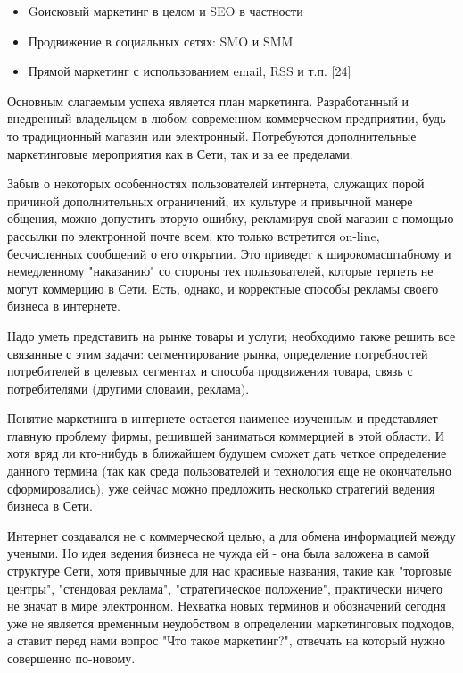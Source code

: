 \documentclass[a4paper,english,russian]{G2-105}
\begin{document}
\begin{itemize}
\item Gоисковый маркетинг в целом и SEO в частности
\item Продвижение в социальных сетях: SMO и SMM
\item Прямой маркетинг с использованием email, RSS и т.п. [24]
\end{itemize}
\par Основным слагаемым успеха является план маркетинга. Разработанный и внедренный владельцем в любом современном коммерческом предприятии, будь то традиционный магазин или электронный. Потребуются дополнительные маркетинговые мероприятия как в Сети, так и за ее пределами.
\par Забыв о некоторых особенностях пользователей интернета, служащих порой причиной дополнительных ограничений, их культуре и привычной манере общения, можно допустить вторую ошибку, рекламируя свой магазин с помощью рассылки по электронной почте всем, кто только встретится on-line, бесчисленных сообщений о его открытии. Это приведет к широкомасштабному и немедленному "наказанию" со стороны тех пользователей, которые терпеть не могут коммерцию в Сети. Есть, однако, и корректные способы рекламы своего бизнеса в интернете.
\par Надо уметь представить на рынке товары и услуги; необходимо также решить все связанные с этим задачи: сегментирование рынка, определение потребностей потребителей в целевых сегментах и способа продвижения товара, связь с потребителями (другими словами, реклама).
\par Понятие маркетинга в интернете остается наименее изученным и представляет главную проблему фирмы, решившей заниматься коммерцией в этой области. И хотя вряд ли кто-нибудь в ближайшем будущем сможет дать четкое определение данного термина (так как среда пользователей и технология еще не окончательно сформировались), уже сейчас можно предложить несколько стратегий ведения бизнеса в Сети.
\par Интернет создавался не с коммерческой целью, а для обмена информацией между учеными. Но идея ведения бизнеса не чужда ей - она была заложена в самой структуре Сети, хотя привычные для нас красивые названия, такие как "торговые центры", "стендовая реклама", "стратегическое положение", практически ничего не значат в мире электронном. Нехватка новых терминов и обозначений сегодня уже не является временным неудобством в определении маркетинговых подходов, а ставит перед нами вопрос "Что такое маркетинг?", отвечать на который нужно совершенно по-новому.
\end{document}
